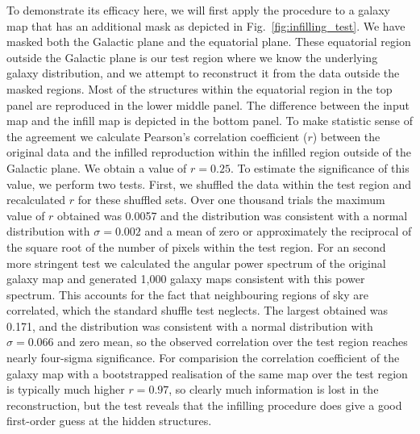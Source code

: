 \documentclass[useAMS,usenatbib]{mn2e}
\begin{document}
To demonstrate its efficacy here, we will first apply the procedure to
a galaxy map that has an additional mask as depicted in
Fig.~\ref{fig:infilling_test}.  We have masked both the Galactic plane
and the equatorial plane.  These equatorial region outside the
Galactic plane is our test region where we know the underlying galaxy
distribution, and we attempt to reconstruct it from the data outside
the masked regions.  Most of the structures within the equatorial
region in the top panel are reproduced in the lower middle panel.  The
difference between the input map and the infill map is depicted in the
bottom panel. To make statistic sense of the agreement we calculate
Pearson's correlation coefficient ($r$) between the original data and
the infilled reproduction within the infilled region outside of the
Galactic plane.  We obtain a value of $r=0.25$.  To estimate the
significance of this value, we perform two tests.  First, we shuffled
the data within the test region and recalculated $r$ for these
shuffled sets.  Over one thousand trials the maximum value of $r$
obtained was 0.0057 and the distribution was consistent with a normal
distribution with $\sigma=0.002$ and a mean of zero or approximately
the reciprocal of the square root of the number of pixels within the
test region.  For an second more stringent test we calculated the
angular power spectrum of the original galaxy map and generated 1,000
galaxy maps consistent with this power spectrum.  This accounts for
the fact that neighbouring regions of sky are correlated, which the
standard shuffle test neglects.  The largest obtained was 0.171, and
the distribution was consistent with a normal distribution with
$\sigma=0.066$ and zero mean, so the observed correlation over the
test region reaches nearly four-sigma significance.  For comparision
the correlation coefficient of the galaxy map with a bootstrapped
realisation of the same map over the test region is typically much
higher $r=0.97$, so clearly much information is lost in the
reconstruction, but the test reveals that the infilling procedure does
give a good first-order guess at the hidden structures.
\end{document}

